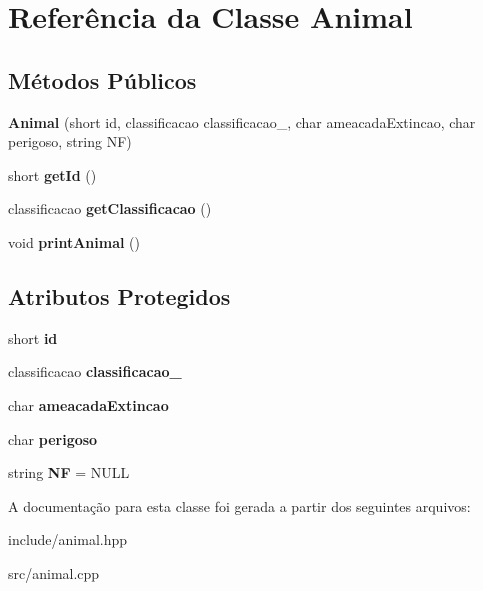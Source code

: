 \hypertarget{classAnimal}{}\section{Referência da Classe Animal}
\label{classAnimal}
\subsection*{Métodos Públicos}
\begin{DoxyCompactItemize}
\item 
\mbox{\label{classAnimal_afab1f7fd88529495bca5d619a6b51108}} 
{\bfseries Animal} (short id, classificacao classificacao\+\_\+, char ameacada\+Extincao, char perigoso, string NF)
\item 
\mbox{\label{classAnimal_a7754a3d0a7fc215bb442671911c4f18d}} 
short {\bfseries get\+Id} ()
\item 
\mbox{\label{classAnimal_ae15d1b3d88d29c630b688f27758c50d4}} 
classificacao {\bfseries get\+Classificacao} ()
\item 
\mbox{\label{classAnimal_a9654ef404c34ef6cba5a71c8f4b27b3a}} 
void {\bfseries print\+Animal} ()
\end{DoxyCompactItemize}
\subsection*{Atributos Protegidos}
\begin{DoxyCompactItemize}
\item 
\mbox{\label{classAnimal_acb56069a72c1d256834968efc112072e}} 
short {\bfseries id}
\item 
\mbox{\label{classAnimal_a802ef246d655a812ba406cdf652f5bc1}} 
classificacao {\bfseries classificacao\+\_\+}
\item 
\mbox{\label{classAnimal_aeb8c79818ae84e0ac2fc7ab8761e7dc1}} 
char {\bfseries ameacada\+Extincao}
\item 
\mbox{\label{classAnimal_a591bb1c49f5d9abc6961497477e85f95}} 
char {\bfseries perigoso}
\item 
\mbox{\label{classAnimal_aaac3d95570d4030dcb39a4c08dbbf94e}} 
string {\bfseries NF} = N\+U\+LL
\end{DoxyCompactItemize}


A documentação para esta classe foi gerada a partir dos seguintes arquivos\+:\begin{DoxyCompactItemize}
\item 
include/animal.\+hpp\item 
src/animal.\+cpp\end{DoxyCompactItemize}
